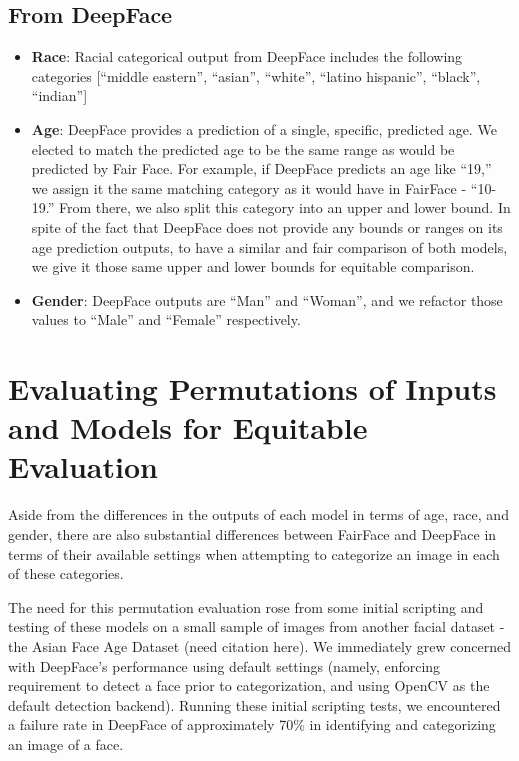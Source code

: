 \documentclass[
  letterpaper,
  DIV=11,
  numbers=noendperiod]{scrreprt}
\begin{document}
\hypertarget{from-deepface}{%
\subsection{From DeepFace}\label{from-deepface}}

\begin{itemize}
\item
  \textbf{Race}: Racial categorical output from DeepFace includes the
  following categories {[}``middle eastern'', ``asian'', ``white'',
  ``latino hispanic'', ``black'', ``indian''{]}
\item
  \textbf{Age}: DeepFace provides a prediction of a single, specific,
  predicted age. We elected to match the predicted age to be the same
  range as would be predicted by Fair Face. For example, if DeepFace
  predicts an age like ``19,'' we assign it the same matching category
  as it would have in FairFace - ``10-19.'' From there, we also split
  this category into an upper and lower bound. In spite of the fact that
  DeepFace does not provide any bounds or ranges on its age prediction
  outputs, to have a similar and fair comparison of both models, we give
  it those same upper and lower bounds for equitable comparison.
\item
  \textbf{Gender}: DeepFace outputs are ``Man'' and ``Woman'', and we
  refactor those values to ``Male'' and ``Female'' respectively.
\end{itemize}

\hypertarget{evaluating-permutations-of-inputs-and-models-for-equitable-evaluation}{%
\section{Evaluating Permutations of Inputs and Models for Equitable
Evaluation}\label{evaluating-permutations-of-inputs-and-models-for-equitable-evaluation}}

Aside from the differences in the outputs of each model in terms of age,
race, and gender, there are also substantial differences between
FairFace and DeepFace in terms of their available settings when
attempting to categorize an image in each of these categories.

The need for this permutation evaluation rose from some initial
scripting and testing of these models on a small sample of images from
another facial dataset - the Asian Face Age Dataset (need citation
here). We immediately grew concerned with DeepFace's performance using
default settings (namely, enforcing requirement to detect a face prior
to categorization, and using OpenCV as the default detection backend).
Running these initial scripting tests, we encountered a failure rate in
DeepFace of approximately 70\% in identifying and categorizing an image
of a face.
\end{document}
